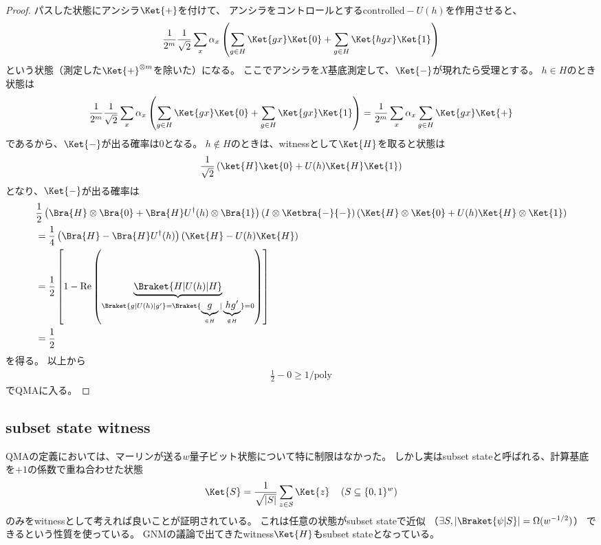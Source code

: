 \documentclass[a4paper, 10pt]{jsarticle}
\begin{document}
\begin{proof}
	パスした状態にアンシラ$\Ket{+}$を付けて、
	アンシラをコントロールとする$\mathrm{controlled-} U(h)$を作用させると、
	\begin{align}
		\frac{1}{2^m} \frac{1}{\sqrt{2}} \sum_x \alpha_x \left( \sum_{g \in H}
		\Ket{gx} \Ket{0} + \sum_{g \in H} \Ket{hgx} \Ket{1} \right)
	\end{align}
	という状態（測定した$\Ket{+}^{\otimes m}$を除いた）になる。
	ここでアンシラを$X$基底測定して、$\Ket{-}$が現れたら受理とする。
	$h \in H$のとき状態は
	\begin{align}
		\frac{1}{2^m} \frac{1}{\sqrt{2}} \sum_x \alpha_x \left( \sum_{g \in H}
		\Ket{gx} \Ket{0} + \sum_{g \in H} \Ket{gx} \Ket{1} \right)
		= \frac{1}{2^m} \sum_x \alpha_x \sum_{g \in H} \Ket{gx} \Ket{+}
	\end{align}
	であるから、$\Ket{-}$が出る確率は0となる。
	$h \notin H$のときは、witnessとして$\Ket{H}$を取ると状態は
	\begin{align}
		\frac{1}{\sqrt{2}} \left( \ket{H}\ket{0} + U(h) \Ket{H}\Ket{1} \right)
	\end{align}
	となり、$\Ket{-}$が出る確率は
	\begin{align}
		&\frac{1}{2} \left( \Bra{H} \otimes \Bra{0} 
		+ \Bra{H} U^\dagger (h) \otimes \Bra{1} \right) \left( I \otimes
		\Ketbra{-}{-} \right) \left( \Ket{H} \otimes \Ket{0}
		+ U(h) \Ket{H} \otimes \Ket{1} \right) \\
		&= \frac{1}{4} \left( \Bra{H} - \Bra{H} U^\dagger (h) \right)
		\left( \Ket{H} - U(h) \Ket{H} \right) \\
		&= \frac{1}{2} \left[ 1
		- \mathrm{Re} \left( \underbrace{\Braket{H | U(h) | H}}_
		{\Braket{g | U(h) | g'} =
		\Braket{\underbrace{g}_{\in H} | \underbrace{hg'}_{\notin H}} = 0}
		\right) \right] \\
		&= \frac{1}{2}
	\end{align}
	を得る。
	以上から
	\begin{align}
		\frac{1}{2} - 0 \geq 1/\mathrm{poly}
	\end{align}
	でQMAに入る。
\end{proof}

\subsection{subset state witness}
QMAの定義においては、マーリンが送る$w$量子ビット状態について特に制限はなかった。
しかし実はsubset stateと呼ばれる、計算基底を$+1$の係数で重ね合わせた状態
\begin{align}
	\Ket{S} = \frac{1}{\sqrt{|S|}} \sum_{z \in S} \Ket{z} \quad
	\left( S \subseteq \{0, 1\}^w \right)
\end{align}
のみをwitnessとして考えれば良いことが証明されている。
これは任意の状態がsubset stateで近似
（$\exists S, \left| \Braket{\psi|S} \right| = \Omega(w^{-1/2})$）
できるという性質を使っている。
GNMの議論で出てきたwitness$\Ket{H}$もsubset stateとなっている。
\end{document}
